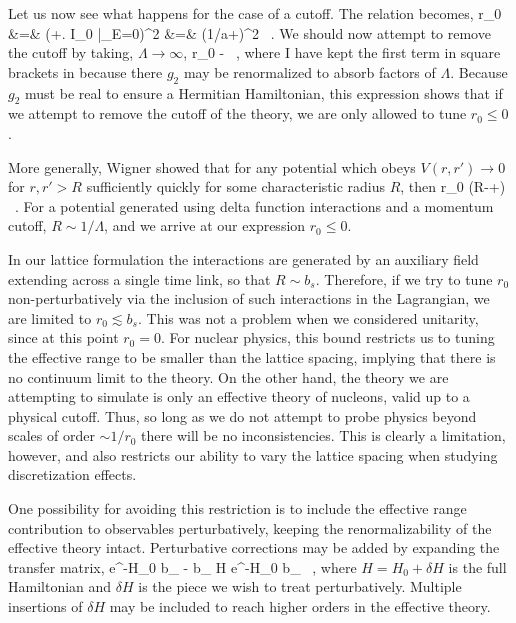 Let us now see what happens for the case of a cutoff. The relation becomes,
\beq
\label{eq:r0cutoff}
r_0 &=&  \left(+\left. I_0 \right|_{E=0}\right)^2  \cr
&=&  \left(1/a+\Lambda\right)^2  \ .
\eeq
We should now attempt to remove the cutoff by taking, $\Lambda \to \infty$,
\beq
r_0 \underset{\Lambda\to\infty}{\longrightarrow} - \ ,
\eeq
where I have kept the first term in square brackets in  because there $g_2$ may be renormalized to absorb factors of $\Lambda$. Because $g_2$ must be real to ensure a Hermitian Hamiltonian, this expression shows that if we attempt to remove the cutoff of the theory, we are only allowed to tune $r_0 \leq 0$. 

More generally, Wigner showed that for any potential which obeys $V(r,r') \to 0$ for $r,r'>R$ sufficiently quickly for some characteristic radius $R$, then
\beq
r_0 \left(R-+\right) \ .
\eeq
For a potential generated using delta function interactions and a momentum cutoff, $R\sim 1/\Lambda$, and we arrive at our expression $r_0\leq 0$.

In our lattice formulation the interactions are generated by an auxiliary field extending across a single time link, so that $R \sim b_s$. Therefore, if we try to tune $r_0$ non-perturbatively via the inclusion of such interactions in the Lagrangian, we are limited to $r_0 \lesssim b_s$. This was not a problem when we considered unitarity, since at this point $r_0 =0$. For nuclear physics, this bound restricts us to tuning the effective range to be smaller than the lattice spacing, implying that there is no continuum limit to the theory. On the other hand, the theory we are attempting to simulate is only an effective theory of nucleons, valid up to a physical cutoff. Thus, so long as we do not attempt to probe physics beyond scales of order $\sim 1/r_0$ there will be no inconsistencies. This is clearly a limitation, however, and also restricts our ability to vary the lattice spacing when studying discretization effects.

One possibility for avoiding this restriction is to include the effective range contribution to observables perturbatively, keeping the renormalizability of the effective theory intact. Perturbative corrections may be added by expanding the transfer matrix,
\beq
\calT \approx e^{-H_0 b_{\tau}} - b_{\tau} \delta H e^{-H_0 b_{\tau}} \ ,
\eeq
where $H = H_0 + \delta H$ is the full Hamiltonian and $\delta H$ is the piece we wish to treat perturbatively. Multiple insertions of $\delta H$ may be included to reach higher orders in the effective theory.

